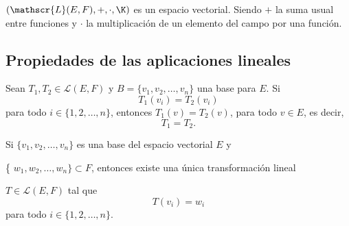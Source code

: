 \documentclass[compacto,10pt]{pubciencias-notas}
\begin{document}
\begin{teo}
    $(\mathscr{L}(E,F), +, \cdot, \K)$ es un espacio vectorial. Siendo $+$ la suma usual entre funciones y $\cdot$ la multiplicación de un elemento del campo por una función.
\end{teo}
\subsection{Propiedades de las aplicaciones lineales}

\begin{prop}
Sean $T_1,T_2 \in \mathscr{L}(E,F)$ y $B= \{v_1, v_2, \ldots, v_n\}$ una base para $E$. Si
\[
    T_1(v_i) = T_2(v_i)
\]
para todo $i \in \{1, 2, \ldots, n\}$, entonces $T_1(v)=T_2(v)$, para todo $v\in E$, es decir, 
\[
    T_1 = T_2.
\]
\end{prop}

\begin{prop}
Si $\{v_1, v_2, \ldots, v_n\}$ es una base del espacio vectorial $E$ y 

\noindent \{ $w_1, w_2, \ldots, w_n \} \subset F$, entonces existe una única transformación lineal

\noindent $T \in \mathscr{L}(E,F)$ tal que
\[
    T(v_i) = w_i
\]
para todo $i\in \{1, 2, \ldots, n\}$.
\end{prop}
\end{document}
